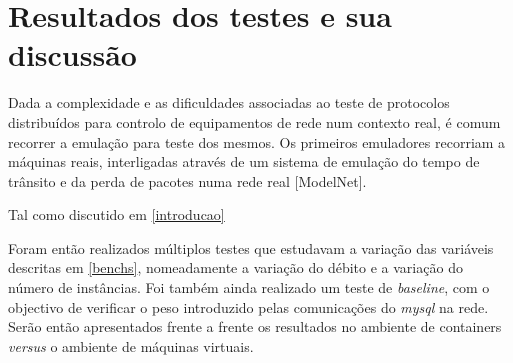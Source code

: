 
\section{Resultados dos testes e sua discussão}


Dada a complexidade e as dificuldades associadas ao teste de
protocolos distribuídos para controlo de equipamentos de rede num
contexto real, é comum recorrer a emulação para teste dos mesmos. Os
primeiros emuladores recorriam a máquinas reais, interligadas através
de um sistema de emulação do tempo de trânsito e da perda de pacotes
numa rede real [ModelNet].

Tal como discutido em \ref{introducao}

Foram então realizados múltiplos testes que estudavam a variação das variáveis descritas em \ref{benchs}, nomeadamente a variação do débito e a variação do número de instâncias. Foi também ainda realizado um teste de \textit{baseline}, com o objectivo de verificar o peso introduzido pelas comunicações do \textit{mysql} na rede. Serão então apresentados frente a frente os resultados no ambiente de containers \textit{versus} o ambiente de máquinas virtuais.


